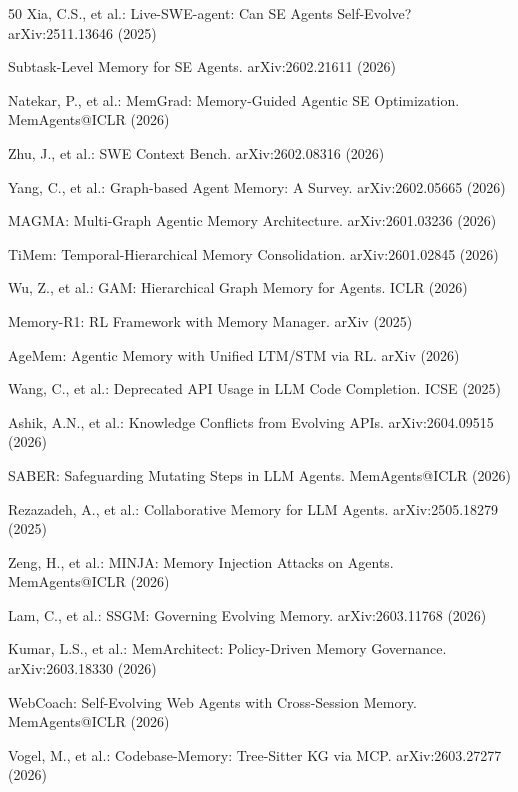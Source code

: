 \documentclass[runningheads]{llncs}
\begin{document}
\begin{thebibliography}{50}
Xia, C.S., et al.: Live-SWE-agent: Can SE Agents Self-Evolve? arXiv:2511.13646 (2025)

Subtask-Level Memory for SE Agents. arXiv:2602.21611 (2026)

Natekar, P., et al.: MemGrad: Memory-Guided Agentic SE Optimization. MemAgents@ICLR (2026)

Zhu, J., et al.: SWE Context Bench. arXiv:2602.08316 (2026)

Yang, C., et al.: Graph-based Agent Memory: A Survey. arXiv:2602.05665 (2026)

MAGMA: Multi-Graph Agentic Memory Architecture. arXiv:2601.03236 (2026)

TiMem: Temporal-Hierarchical Memory Consolidation. arXiv:2601.02845 (2026)

Wu, Z., et al.: GAM: Hierarchical Graph Memory for Agents. ICLR (2026)

Memory-R1: RL Framework with Memory Manager. arXiv (2025)

AgeMem: Agentic Memory with Unified LTM/STM via RL. arXiv (2026)

Wang, C., et al.: Deprecated API Usage in LLM Code Completion. ICSE (2025)

Ashik, A.N., et al.: Knowledge Conflicts from Evolving APIs. arXiv:2604.09515 (2026)

SABER: Safeguarding Mutating Steps in LLM Agents. MemAgents@ICLR (2026)

Rezazadeh, A., et al.: Collaborative Memory for LLM Agents. arXiv:2505.18279 (2025)

Zeng, H., et al.: MINJA: Memory Injection Attacks on Agents. MemAgents@ICLR (2026)

Lam, C., et al.: SSGM: Governing Evolving Memory. arXiv:2603.11768 (2026)

Kumar, L.S., et al.: MemArchitect: Policy-Driven Memory Governance. arXiv:2603.18330 (2026)

WebCoach: Self-Evolving Web Agents with Cross-Session Memory. MemAgents@ICLR (2026)

Vogel, M., et al.: Codebase-Memory: Tree-Sitter KG via MCP. arXiv:2603.27277 (2026)


\end{thebibliography}
\end{document}
